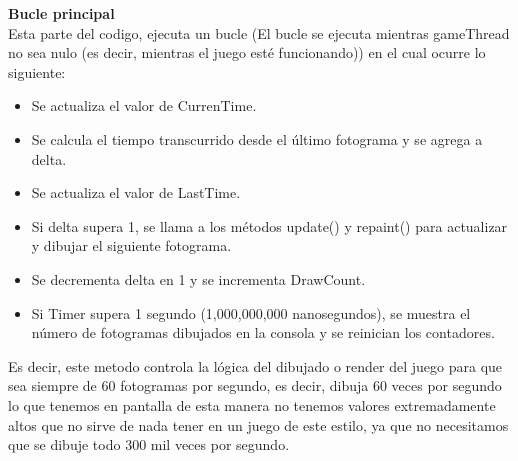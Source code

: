 \documentclass[a4paper]{article}
\begin{document}
\textbf{Bucle principal}\\
Esta parte del codigo, ejecuta un bucle (El bucle se ejecuta mientras gameThread no sea nulo (es decir, mientras el juego esté funcionando)) en el cual ocurre lo siguiente:
\begin{itemize}
    \item Se actualiza el valor de CurrenTime.
    \item Se calcula el tiempo transcurrido desde el último fotograma y se agrega a delta.
    \item Se actualiza el valor de LastTime.
    \item Si delta supera 1, se llama a los métodos update() y repaint() para actualizar y dibujar el siguiente fotograma.
    \item Se decrementa delta en 1 y se incrementa DrawCount.
    \item Si Timer supera 1 segundo (1,000,000,000 nanosegundos), se muestra el número de fotogramas dibujados en la consola y se reinician los contadores.
\end{itemize}
Es decir, este metodo controla la lógica del dibujado o render del juego para que sea siempre de 60 fotogramas por segundo, es decir, dibuja 60 veces por segundo lo que tenemos en pantalla
de esta manera no tenemos valores extremadamente altos que no sirve de nada tener en un juego de este estilo, ya que no necesitamos que se dibuje todo 300 mil veces por segundo.\\

\clearpage
\end{document}
